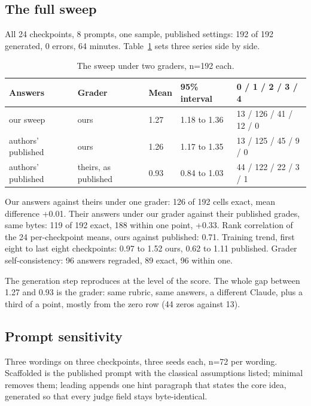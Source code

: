 \documentclass[reprint,prx,amsmath,amssymb,aps,superscriptaddress]{revtex4-2}
\begin{document}
\subsection{The full sweep}

All 24 checkpoints, 8 prompts, one sample, published settings: 192 of 192 generated, 0 errors, 64 minutes. Table~\ref{tab:sweep} sets three series side by side.

\begin{table}[t]
\caption{The sweep under two graders, n=192 each.}
\label{tab:sweep}
\begin{ruledtabular}
\begin{tabular}{lllll}
Answers & Grader & Mean & 95\% interval & 0 / 1 / 2 / 3 / 4 \\
\hline
our sweep & ours & 1.27 & 1.18 to 1.36 & 13 / 126 / 41 / 12 / 0 \\
authors' published & ours & 1.26 & 1.17 to 1.35 & 13 / 125 / 45 / 9 / 0 \\
authors' published & theirs, as published & 0.93 & 0.84 to 1.03 & 44 / 122 / 22 / 3 / 1 \\
\end{tabular}
\end{ruledtabular}
\end{table}

Our answers against theirs under one grader: 126 of 192 cells exact, mean difference +0.01. Their answers under our grader against their published grades, same bytes: 119 of 192 exact, 188 within one point, +0.33. Rank correlation of the 24 per-checkpoint means, ours against published: 0.71. Training trend, first eight to last eight checkpoints: 0.97 to 1.52 ours, 0.62 to 1.11 published. Grader self-consistency: 96 answers regraded, 89 exact, 96 within one.

The generation step reproduces at the level of the score. The whole gap between 1.27 and 0.93 is the grader: same rubric, same answers, a different Claude, plus a third of a point, mostly from the zero row (44 zeros against 13).

\subsection{Prompt sensitivity}

Three wordings on three checkpoints, three seeds each, n=72 per wording. Scaffolded is the published prompt with the classical assumptions listed; minimal removes them; leading appends one hint paragraph that states the core idea, generated so that every judge field stays byte-identical.
\end{document}
